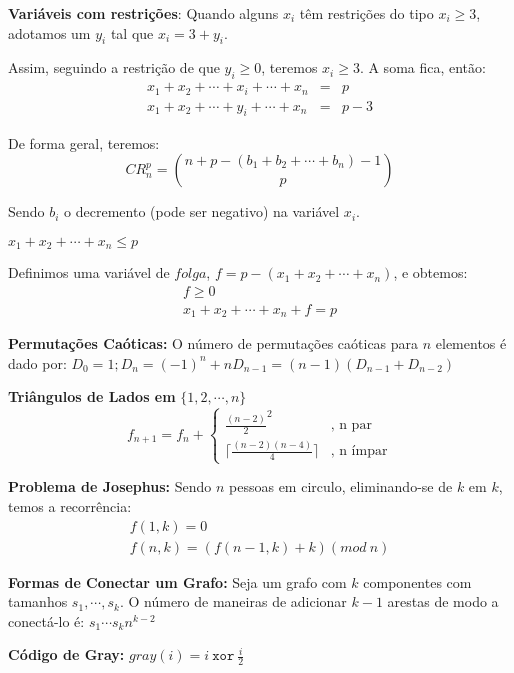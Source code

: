   {\bf Variáveis com restrições}: Quando alguns $x_{i}$ têm restrições do tipo $x_{i} \geq 3$, adotamos um $y_{i}$ tal que $x_{i} = 3+y_{i}$.

  Assim, seguindo a restrição de que $y_{i} \geq 0$, teremos $x_{i} \geq 3$. A soma fica, então:
  $$
  \begin{array}{rcl}
    x_{1} + x_{2} + \cdots + x_{i} + \cdots + x_{n} &=& p \\
    x_{1} + x_{2} + \cdots + y_{i} + \cdots + x_{n} &=& p-3
  \end{array}
  $$

  De forma geral, teremos:
  $$
  CR_{n}^{p} = {n+p-(b_{1}+b_{2}+\cdots+b_{n})-1 \choose p}
  $$

  Sendo $b_{i}$ o decremento (pode ser negativo) na variável $x_{i}$.

  {\boldmath $x_{1} + x_{2} + \cdots + x_{n} \leq p$}

  Definimos uma variável de $folga$, $f = p - (x_{1} + x_{2} + \cdots + x_{n})$, e obtemos:
  $$
  \begin{array}{l}
    f \geq 0 \\
    x_{1} + x_{2} + \cdots + x_{n} + f = p
  \end{array}
  $$

  {\bf Permutações Caóticas:}
  O número de permutações caóticas para $n$ elementos é dado por:
  $D_{0}=1; D_{n}=(-1)^{n} + nD_{n-1} = (n-1)\left( D_{n-1}+D_{n-2} \right)$

  {\bf Triângulos de Lados em} {\boldmath $\{1, 2, \cdots, n\}$}
  $$
  f_{n+1} = f_{n} + \left\{
  \begin{array}{ll}
    \frac{(n-2)}{2}^{2}                  &\textrm{, n par} \\
    \Big\lceil \frac{(n-2)(n-4)}{4} \Big\rceil &\textrm{, n ímpar}
  \end{array} \right.
  $$

  {\bf Problema de Josephus:}
  Sendo $n$ pessoas em circulo, eliminando-se de $k$ em $k$, temos a recorrência:
  $$
  \begin{array}{l}
    f(1,k) = 0 \\
    f(n,k) = ( f(n-1,k) + k ) (mod\ n)
  \end{array}
  $$

  {\bf Formas de Conectar um Grafo:}
  Seja um grafo com $k$ componentes com tamanhos $s_1,\cdots,s_k$. O número de
  maneiras de adicionar $k-1$ arestas de modo a conectá-lo é:
  $s_1 \cdots s_k n^{k-2}$

  {\bf Código de Gray:} $gray(i) = i\ \texttt{xor}\ \frac{i}{2}$

